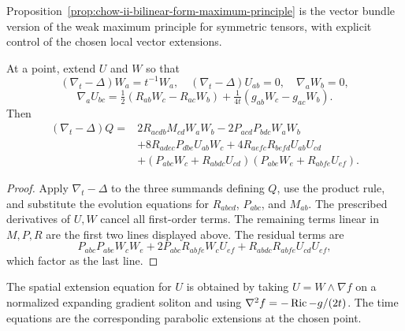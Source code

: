 \begin{remark}
\label{rem:chow-ii-bilinear-form-maximum-principle-comparison}
Proposition~\ref{prop:chow-ii-bilinear-form-maximum-principle} is the vector
bundle version of the weak maximum principle for symmetric tensors, with
explicit control of the chosen local vector extensions.
\end{remark}

\begin{theorem}
\label{thm:chow-ii-harnack-quadratic-evolution}
At a point, extend \(U\) and \(W\) so that
\[
(\nabla_t-\Delta)W_a=t^{-1}W_a,\quad
(\nabla_t-\Delta)U_{ab}=0,\quad \nabla_aW_b=0,
\]
\[
\nabla_aU_{bc}=\tfrac12(R_{ab}W_c-R_{ac}W_b)
+\tfrac1{4t}(g_{ab}W_c-g_{ac}W_b).
\]
Then
\[
\begin{aligned}
(\nabla_t-\Delta)Q={}&2R_{acdb}M_{cd}W_aW_b-2P_{acd}P_{bdc}W_aW_b\\
&+8R_{adec}P_{dbe}U_{ab}W_c+4R_{aefc}R_{befd}U_{ab}U_{cd}\\
&+(P_{abc}W_c+R_{abdc}U_{cd})
(P_{abe}W_e+R_{abfe}U_{ef}).
\end{aligned}
\]
\end{theorem}
\begin{proof}
Apply \(\nabla_t-\Delta\) to the three summands defining \(Q\), use the
product rule, and substitute the evolution equations for \(R_{abcd}\),
\(P_{abc}\), and \(M_{ab}\).  The prescribed derivatives of \(U,W\) cancel
all first-order terms.  The remaining terms linear in \(M,P,R\) are the first
two lines displayed above.  The residual terms are
\[
P_{abc}P_{abe}W_cW_e+2P_{abc}R_{abfe}W_cU_{ef}
+R_{abdc}R_{abfe}U_{cd}U_{ef},
\]
which factor as the last line.
\end{proof}

\begin{remark}
\label{rem:chow-ii-harnack-extension-soliton-motivation}
The spatial extension equation for \(U\) is obtained by taking
\(U=W\wedge\nabla f\) on a normalized expanding gradient soliton and using
\(\nabla^2f=-\operatorname{Ric}-g/(2t)\).  The time equations are the corresponding
parabolic extensions at the chosen point.
\end{remark}

